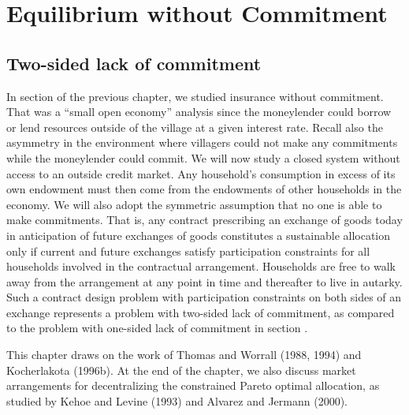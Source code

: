 

\offparens

\overfullrule=0pt

\def\bull{\vrule height .9ex width .8ex depth -.1ex}
\def\bh{\penalty-100}
\chapter{Equilibrium without Commitment \label{socialinsurance2}}

\section{Two-sided lack of commitment}
In section  of the previous chapter, we studied
insurance without commitment. That was a ``small open economy''  analysis
since the moneylender could borrow or lend resources outside
of the village at a given interest rate. Recall also the asymmetry
in the environment where villagers could not make any commitments while
the moneylender could commit.
We will now study a closed system without access to an outside credit
market. Any household's consumption in excess of its own endowment
must then come from the endowments of  other households in the
economy. We will also adopt the symmetric assumption that no one
is able to make
commitments. That is, any contract prescribing an exchange of goods
today in anticipation of future exchanges of goods constitutes a
sustainable allocation only if current and future exchanges satisfy participation constraints
for all households involved in the contractual
arrangement. Households are free to walk away from the arrangement
at any point in time and thereafter to live in autarky. Such a contract design
problem with participation constraints on both sides of an exchange
represents a problem with two-sided lack of commitment, as compared to
the problem with one-sided lack of commitment in
section .

This chapter draws on the work of Thomas and Worrall (1988,
1994) and Kocherlakota (1996b). At the end of the chapter, we also
discuss market arrangements for decentralizing the constrained
Pareto optimal allocation, as studied by Kehoe and Levine (1993)
and Alvarez and Jermann (2000).



